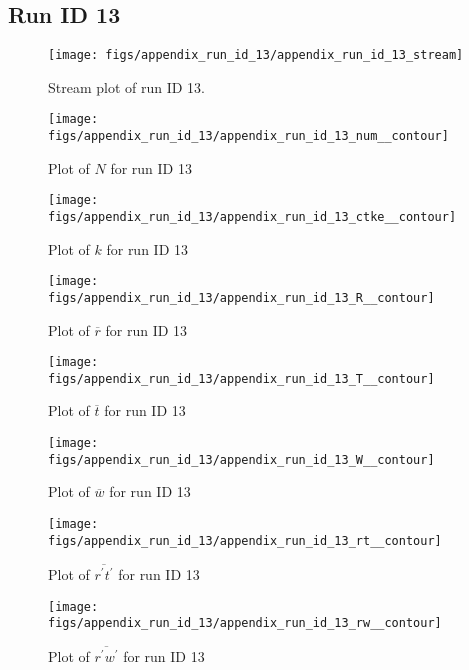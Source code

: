 \subsection{Run ID 13}
\begin{figure}[H]
\centering
\texttt{[image: figs/appendix\_run\_id\_13/appendix\_run\_id\_13\_stream]}
\caption{Stream plot of run ID 13.}
\label{fig:appendix_run_id_13_stream}
\end{figure}


\begin{figure}[H]
\centering
\texttt{[image: figs/appendix\_run\_id\_13/appendix\_run\_id\_13\_num\_\_contour]}
\caption{Plot of $N$ for run ID 13}
\label{fig:appendix_run_id_13_num__contour}
\end{figure}


\begin{figure}[H]
\centering
\texttt{[image: figs/appendix\_run\_id\_13/appendix\_run\_id\_13\_ctke\_\_contour]}
\caption{Plot of $k$ for run ID 13}
\label{fig:appendix_run_id_13_ctke__contour}
\end{figure}


\begin{figure}[H]
\centering
\texttt{[image: figs/appendix\_run\_id\_13/appendix\_run\_id\_13\_R\_\_contour]}
\caption{Plot of $\overline{r}$ for run ID 13}
\label{fig:appendix_run_id_13_R__contour}
\end{figure}


\begin{figure}[H]
\centering
\texttt{[image: figs/appendix\_run\_id\_13/appendix\_run\_id\_13\_T\_\_contour]}
\caption{Plot of $\overline{t}$ for run ID 13}
\label{fig:appendix_run_id_13_T__contour}
\end{figure}


\begin{figure}[H]
\centering
\texttt{[image: figs/appendix\_run\_id\_13/appendix\_run\_id\_13\_W\_\_contour]}
\caption{Plot of $\overline{w}$ for run ID 13}
\label{fig:appendix_run_id_13_W__contour}
\end{figure}


\begin{figure}[H]
\centering
\texttt{[image: figs/appendix\_run\_id\_13/appendix\_run\_id\_13\_rt\_\_contour]}
\caption{Plot of $\overline{r^\prime t^\prime}$ for run ID 13}
\label{fig:appendix_run_id_13_rt__contour}
\end{figure}


\begin{figure}[H]
\centering
\texttt{[image: figs/appendix\_run\_id\_13/appendix\_run\_id\_13\_rw\_\_contour]}
\caption{Plot of $\overline{r^\prime w^\prime}$ for run ID 13}
\label{fig:appendix_run_id_13_rw__contour}
\end{figure}


